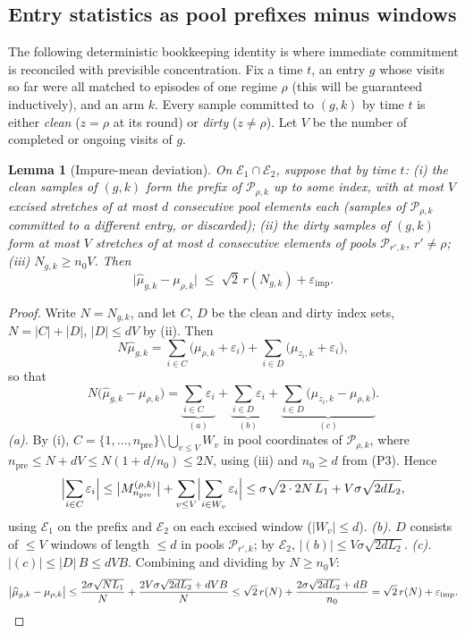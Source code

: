 \documentclass[11pt]{article}
\newtheorem{lemma}{Lemma}
\newcommand{\Ecal}{\mathcal E}
\newcommand{\Pcal}{\mathcal P}
\newcommand{\eimp}{\varepsilon_{\mathrm{imp}}}
\begin{document}
\subsection{Entry statistics as pool prefixes minus windows}

The following deterministic bookkeeping identity is where immediate commitment is reconciled with previsible concentration. Fix a time $t$, an entry $g$ whose visits so far were all matched to episodes of one regime $\rho$ (this will be guaranteed inductively), and an arm $k$. Every sample committed to $(g,k)$ by time $t$ is either \emph{clean} ($z=\rho$ at its round) or \emph{dirty} ($z\ne\rho$). Let $V$ be the number of completed or ongoing visits of $g$.

\begin{lemma}[Impure-mean deviation]
\label{lem:impure_mean}
On $\Ecal_1\cap\Ecal_2$, suppose that by time $t$: (i) the clean samples of $(g,k)$ form the prefix of $\Pcal_{\rho,k}$ up to some index, with at most $V$ excised stretches of at most $d$ consecutive pool elements each (samples of $\Pcal_{\rho,k}$ committed to a \emph{different} entry, or discarded); (ii) the dirty samples of $(g,k)$ form at most $V$ stretches of at most $d$ consecutive elements of pools $\Pcal_{r',k}$, $r'\neq\rho$; (iii) $N_{g,k}\ge n_0V$. Then
\begin{equation}
    \bigl|\widehat\mu_{g,k}-\mu_{\rho,k}\bigr|
    \;\le\;
    \sqrt2\,r(N_{g,k})+\eimp .
    \label{eq:impure_mean}
\end{equation}
\end{lemma}

\begin{proof}
Write $N=N_{g,k}$, and let $C$, $D$ be the clean and dirty index sets, $N=|C|+|D|$, $|D|\le dV$ by (ii). Then
\[
N\widehat\mu_{g,k}
=\sum_{i\in C}\bigl(\mu_{\rho,k}+\varepsilon_i\bigr)
+\sum_{i\in D}\bigl(\mu_{z_i,k}+\varepsilon_i\bigr),
\]
so that
\[
N\bigl(\widehat\mu_{g,k}-\mu_{\rho,k}\bigr)
=\underbrace{\sum_{i\in C}\varepsilon_i}_{(a)}
+\underbrace{\sum_{i\in D}\varepsilon_i}_{(b)}
+\underbrace{\sum_{i\in D}\bigl(\mu_{z_i,k}-\mu_{\rho,k}\bigr)}_{(c)} .
\]
\emph{(a).} By (i), $C=\{1,\ldots,n_{\mathrm{pre}}\}\setminus\bigcup_{v\le V}W_v$ in pool coordinates of $\Pcal_{\rho,k}$, where $n_{\mathrm{pre}}\le N+dV\le N(1+d/n_0)\le 2N$, using (iii) and $n_0\ge d$ from (P3). Hence
\[
\Bigl|\sum_{i\in C}\varepsilon_i\Bigr|
\le\bigl|M^{(\rho,k)}_{n_{\mathrm{pre}}}\bigr|
+\sum_{v\le V}\Bigl|\sum_{i\in W_v}\varepsilon_i\Bigr|
\le\sigma\sqrt{2\cdot2N\,L_1}+V\sigma\sqrt{2dL_2},
\]
using $\Ecal_1$ on the prefix and $\Ecal_2$ on each excised window ($|W_v|\le d$).
\emph{(b).} $D$ consists of $\le V$ windows of length $\le d$ in pools $\Pcal_{r',k}$; by $\Ecal_2$, $|(b)|\le V\sigma\sqrt{2dL_2}$.
\emph{(c).} $|(c)|\le|D|\,B\le dVB$.
Combining and dividing by $N\ge n_0V$:
\[
\bigl|\widehat\mu_{g,k}-\mu_{\rho,k}\bigr|
\le\frac{2\sigma\sqrt{NL_1}}{N}
+\frac{2V\sigma\sqrt{2dL_2}+dVB}{N}
\le\sqrt2\,r(N)+\frac{2\sigma\sqrt{2dL_2}+dB}{n_0}
=\sqrt2\,r(N)+\eimp . \qedhere
\]
\end{proof}
\end{document}
